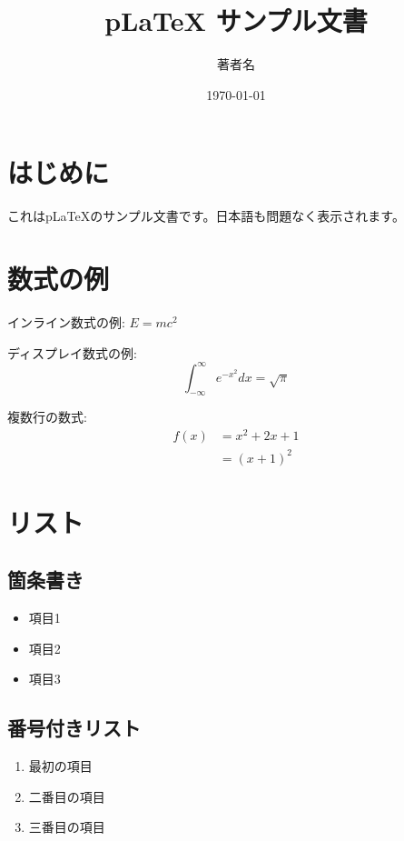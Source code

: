 \documentclass[12pt,a4paper,dvipdfmx]{jarticle}
\title{pLaTeX サンプル文書}
\author{著者名}
\date{\today}
\begin{document}
\maketitle

\section{はじめに}

これはpLaTeXのサンプル文書です。日本語も問題なく表示されます。

\section{数式の例}

インライン数式の例: $E = mc^2$

ディスプレイ数式の例:
\begin{equation}
  \int_{-\infty}^{\infty} e^{-x^2} dx = \sqrt{\pi}
\end{equation}

複数行の数式:
\begin{align}
  f(x) &= x^2 + 2x + 1 \\
  &= (x + 1)^2
\end{align}

\section{リスト}

\subsection{箇条書き}

\begin{itemize}
  \item 項目1
  \item 項目2
  \item 項目3
\end{itemize}

\subsection{番号付きリスト}

\begin{enumerate}
  \item 最初の項目
  \item 二番目の項目
  \item 三番目の項目
\end{enumerate}
\end{document}
